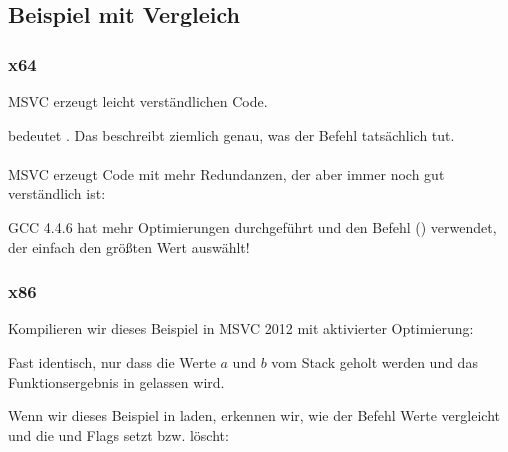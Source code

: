 \subsection{Beispiel mit Vergleich}



\subsubsection{x64}



\Optimizing MSVC erzeugt leicht verständlichen Code.

 bedeutet . Das beschreibt ziemlich genau, was der Befehl tatsächlich tut.\\
\\
\NonOptimizing MSVC erzeugt Code mit mehr Redundanzen, der aber immer noch gut verständlich ist:



GCC 4.4.6 hat mehr Optimierungen durchgeführt und den Befehl  () verwendet, der einfach den größten Wert auswählt!



\clearpage
\subsubsection{x86}
Kompilieren wir dieses Beispiel in MSVC 2012 mit aktivierter Optimierung:


Fast identisch, nur dass die Werte $a$ und $b$ vom Stack geholt werden und das Funktionsergebnis in  gelassen
wird.

Wenn wir dieses Beispiel in \olly laden, erkennen wir, wie der Befehl  Werte vergleicht und die \CF und \PF
Flags setzt bzw. löscht:

